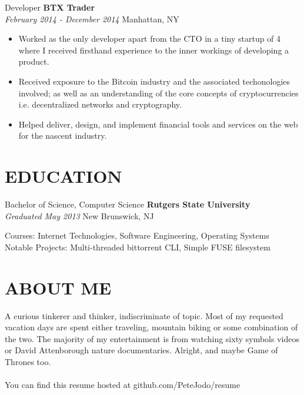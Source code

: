\documentclass[margin]{res}
\begin{document}
\begin{resume}
	Developer \hfill \textbf{BTX Trader} \\
	\textsl{February 2014 - December 2014} \hfill Manhattan, NY

    \begin{itemize} \itemsep -2pt %
    \item Worked as the only developer apart from the CTO in a tiny startup of 4 where I received firsthand experience to the inner workings of developing a product.
    \item Received exposure to the Bitcoin industry and the associated techonologies involved; as well as an understanding of the core concepts of cryptocurrencies i.e. decentralized networks and cryptography.
    \item Helped deliver, design, and implement financial tools and services on the web for the nascent industry.
    \end{itemize}

\section{EDUCATION}
    Bachelor of Science, Computer Science \hfill \textbf{Rutgers State University} \\
    \textsl{Graduated May 2013} \hfill New Brunswick, NJ

    Courses: {\small Internet Technologies, Software Engineering, Operating Systems} \\
    Notable Projects: {\small Multi-threaded bittorrent CLI, Simple FUSE filesystem}

\section{ABOUT ME}
    A curious tinkerer and thinker, indiscriminate of topic. Most of my requested vacation days are spent either traveling, mountain biking or some combination of the two. The majority of my entertainment is from watching sixty symbols videos or David Attenborough nature documentaries. Alright, and maybe Game of Thrones too. \\
    \\
    {\small You can find this resume hosted at github.com/PeteJodo/resume}


\end{resume}
\end{document}
